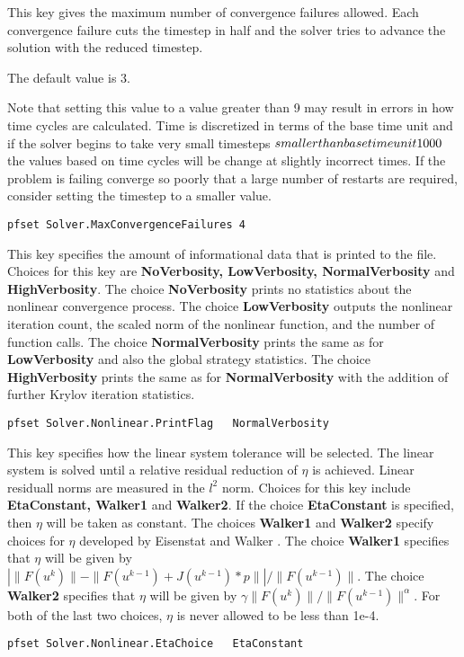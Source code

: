 {This key gives the maximum number of convergence failures
allowed.   Each convergence failure cuts the timestep
in half and the solver tries to advance the solution with the reduced
timestep.

The default value is 3.

Note that setting this value to a value greater than 9 may result in
errors in how time cycles are calculated.  Time is discretized in
terms of the base time unit and if the solver begins to take very
small timesteps \(smaller than base time unit \/ 1000\) the values based
on time cycles will be change at slightly incorrect times. If the
problem is failing converge so poorly that a large number of restarts are
required, consider setting the timestep to a smaller value.
}
\begin{display}\begin{verbatim}
pfset Solver.MaxConvergenceFailures 4
\end{verbatim}\end{display}

{This key specifies the amount of informational data that is printed to the
 file.  Choices for this key are {\bf NoVerbosity,
LowVerbosity, NormalVerbosity} and {\bf  HighVerbosity}.  The choice
{\bf NoVerbosity} prints no statistics about the nonlinear convergence
process.  The choice {\bf LowVerbosity} outputs the nonlinear iteration count,
the scaled norm of the nonlinear function, and the number of function calls.
The choice {\bf NormalVerbosity} prints the same as for {\bf LowVerbosity}
and also the global strategy statistics.  The choice {\bf HighVerbosity} prints
the same as for {\bf NormalVerbosity} with the addition of further Krylov
iteration statistics.
}
\begin{display}\begin{verbatim}
pfset Solver.Nonlinear.PrintFlag   NormalVerbosity
\end{verbatim}\end{display}

{This key specifies how the linear system tolerance will be selected.
The linear system is solved until a relative residual reduction of $\eta$
is achieved.  Linear residuall norms are measured in the $l^2$ norm.
Choices for this key include {\bf EtaConstant, Walker1} and
{\bf Walker2}.  If the choice {\bf EtaConstant} is specified, then $\eta$ will
be taken as constant.  The choices {\bf Walker1} and {\bf Walker2} specify
choices for $\eta$ developed by Eisenstat and Walker \cite{EW96}.  The choice
{\bf Walker1} specifies that $\eta$ will be given by
$| \|F(u^k)\| - \|F(u^{k-1}) + J(u^{k-1})*p \|  |  / \|F(u^{k-1})\|$. The
choice {\bf Walker2} specifies that $\eta$ will be given by
$\gamma \|F(u^k)\| / \|F(u^{k-1})\|^{\alpha}$.  For both of the last two
choices, $\eta$ is never allowed to be less than 1e-4.
}
\begin{display}\begin{verbatim}
pfset Solver.Nonlinear.EtaChoice   EtaConstant
\end{verbatim}\end{display}


